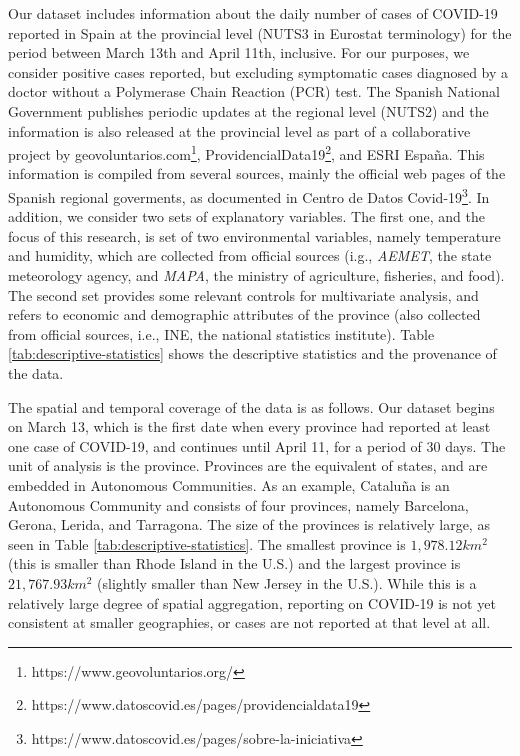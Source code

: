 \documentclass[]{elsarticle} %
\begin{document}
Our dataset includes information about the daily number of cases of
COVID-19 reported in Spain at the provincial level (NUTS3 in Eurostat
terminology) for the period between March 13th and April 11th,
inclusive. For our purposes, we consider positive cases reported, but
excluding symptomatic cases diagnosed by a doctor without a Polymerase
Chain Reaction (PCR) test. The Spanish National Government publishes
periodic updates at the regional level (NUTS2) and the information is
also released at the provincial level as part of a collaborative project
by geovoluntarios.com\footnote{https://www.geovoluntarios.org/},
ProvidencialData19\footnote{https://www.datoscovid.es/pages/providencialdata19},
and ESRI España. This information is compiled from several sources,
mainly the official web pages of the Spanish regional goverments, as
documented in Centro de Datos
Covid-19\footnote{https://www.datoscovid.es/pages/sobre-la-iniciativa}.
In addition, we consider two sets of explanatory variables. The first
one, and the focus of this research, is set of two environmental
variables, namely temperature and humidity, which are collected from
official sources (i.g., \emph{AEMET}, the state meteorology agency, and
\emph{MAPA}, the ministry of agriculture, fisheries, and food). The
second set provides some relevant controls for multivariate analysis,
and refers to economic and demographic attributes of the province (also
collected from official sources, i.e., INE, the national statistics
institute). Table \ref{tab:descriptive-statistics} shows the descriptive
statistics and the provenance of the data.

The spatial and temporal coverage of the data is as follows. Our dataset
begins on March 13, which is the first date when every province had
reported at least one case of COVID-19, and continues until April 11,
for a period of 30 days. The unit of analysis is the province. Provinces
are the equivalent of states, and are embedded in Autonomous
Communities. As an example, Cataluña is an Autonomous Community and
consists of four provinces, namely Barcelona, Gerona, Lerida, and
Tarragona. The size of the provinces is relatively large, as seen in
Table \ref{tab:descriptive-statistics}. The smallest province is
\(1,978.12km^2\) (this is smaller than Rhode Island in the U.S.) and the
largest province is \(21,767.93km^2\) (slightly smaller than New Jersey
in the U.S.). While this is a relatively large degree of spatial
aggregation, reporting on COVID-19 is not yet consistent at smaller
geographies, or cases are not reported at that level at all.
\end{document}
